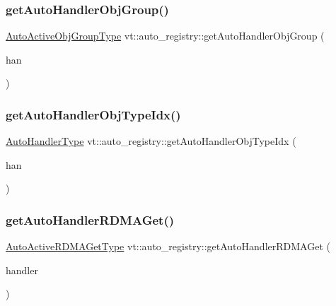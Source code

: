 \subsubsection{\texorpdfstring{get\+Auto\+Handler\+Obj\+Group()}{getAutoHandlerObjGroup()}}
{\footnotesize\ttfamily \hyperlink{namespacevt_1_1auto__registry_a861d9d01e89c81f0a955188724aa25b3}{Auto\+Active\+Obj\+Group\+Type} vt\+::auto\+\_\+registry\+::get\+Auto\+Handler\+Obj\+Group (\begin{DoxyParamCaption}\item[{\hyperlink{namespacevt_af64846b57dfcaf104da3ef6967917573}{Handler\+Type}}]{han }\end{DoxyParamCaption})\hspace{0.3cm}{\ttfamily [inline]}}

\mbox{\label{namespacevt_1_1auto__registry_a0c47caf1e4978208704029c0d0f925f0}} 
\subsubsection{\texorpdfstring{get\+Auto\+Handler\+Obj\+Type\+Idx()}{getAutoHandlerObjTypeIdx()}}
{\footnotesize\ttfamily \hyperlink{namespacevt_1_1auto__registry_ae295e18699146815bb7d7674594d95d7}{Auto\+Handler\+Type} vt\+::auto\+\_\+registry\+::get\+Auto\+Handler\+Obj\+Type\+Idx (\begin{DoxyParamCaption}\item[{\hyperlink{namespacevt_af64846b57dfcaf104da3ef6967917573}{Handler\+Type}}]{han }\end{DoxyParamCaption})\hspace{0.3cm}{\ttfamily [inline]}}

\mbox{\label{namespacevt_1_1auto__registry_a4b0ed1bbbf713383c191339ca281cf0e}} 
\subsubsection{\texorpdfstring{get\+Auto\+Handler\+R\+D\+M\+A\+Get()}{getAutoHandlerRDMAGet()}}
{\footnotesize\ttfamily \hyperlink{namespacevt_1_1auto__registry_a039813f93a5804c77ae612e0318fb335}{Auto\+Active\+R\+D\+M\+A\+Get\+Type} vt\+::auto\+\_\+registry\+::get\+Auto\+Handler\+R\+D\+M\+A\+Get (\begin{DoxyParamCaption}\item[{\hyperlink{namespacevt_af64846b57dfcaf104da3ef6967917573}{Handler\+Type} const \&}]{handler }\end{DoxyParamCaption})\hspace{0.3cm}{\ttfamily [inline]}}


